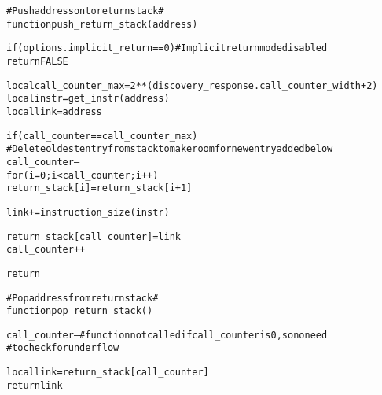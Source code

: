 \pagebreak

\begin{alltt}
# Push address onto return stack #
function push_return_stack (address)

  if (options.implicit_return == 0) # Implicit return mode disabled
    return FALSE

  local call_counter_max = 2**(discovery_response.call_counter_width + 2)
  local instr            = get_instr(address)
  local link             = address

  if (call_counter == call_counter_max)
    # Delete oldest entry from stack to make room for new entry added below
    call_counter--
    for (i = 0; i < call_counter; i++)
      return_stack[i] = return_stack[i+1]

  link += instruction_size(instr)

  return_stack[call_counter] = link
  call_counter++

  return

# Pop address from return stack #
function pop_return_stack ()

  call_counter-- # function not called if call_counter is 0, so no need
                 #  to check for underflow

  local  link = return_stack[call_counter]
  return link
\end{alltt}
